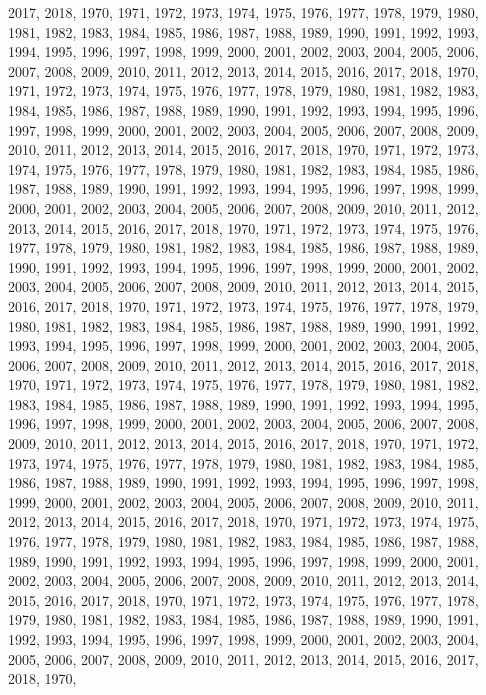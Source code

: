 \documentclass[
]{article}
\begin{document}
2017, 2018, 1970, 1971, 1972, 1973, 1974, 1975, 1976, 1977, 1978, 1979,
1980, 1981, 1982, 1983, 1984, 1985, 1986, 1987, 1988, 1989, 1990, 1991,
1992, 1993, 1994, 1995, 1996, 1997, 1998, 1999, 2000, 2001, 2002, 2003,
2004, 2005, 2006, 2007, 2008, 2009, 2010, 2011, 2012, 2013, 2014, 2015,
2016, 2017, 2018, 1970, 1971, 1972, 1973, 1974, 1975, 1976, 1977, 1978,
1979, 1980, 1981, 1982, 1983, 1984, 1985, 1986, 1987, 1988, 1989, 1990,
1991, 1992, 1993, 1994, 1995, 1996, 1997, 1998, 1999, 2000, 2001, 2002,
2003, 2004, 2005, 2006, 2007, 2008, 2009, 2010, 2011, 2012, 2013, 2014,
2015, 2016, 2017, 2018, 1970, 1971, 1972, 1973, 1974, 1975, 1976, 1977,
1978, 1979, 1980, 1981, 1982, 1983, 1984, 1985, 1986, 1987, 1988, 1989,
1990, 1991, 1992, 1993, 1994, 1995, 1996, 1997, 1998, 1999, 2000, 2001,
2002, 2003, 2004, 2005, 2006, 2007, 2008, 2009, 2010, 2011, 2012, 2013,
2014, 2015, 2016, 2017, 2018, 1970, 1971, 1972, 1973, 1974, 1975, 1976,
1977, 1978, 1979, 1980, 1981, 1982, 1983, 1984, 1985, 1986, 1987, 1988,
1989, 1990, 1991, 1992, 1993, 1994, 1995, 1996, 1997, 1998, 1999, 2000,
2001, 2002, 2003, 2004, 2005, 2006, 2007, 2008, 2009, 2010, 2011, 2012,
2013, 2014, 2015, 2016, 2017, 2018, 1970, 1971, 1972, 1973, 1974, 1975,
1976, 1977, 1978, 1979, 1980, 1981, 1982, 1983, 1984, 1985, 1986, 1987,
1988, 1989, 1990, 1991, 1992, 1993, 1994, 1995, 1996, 1997, 1998, 1999,
2000, 2001, 2002, 2003, 2004, 2005, 2006, 2007, 2008, 2009, 2010, 2011,
2012, 2013, 2014, 2015, 2016, 2017, 2018, 1970, 1971, 1972, 1973, 1974,
1975, 1976, 1977, 1978, 1979, 1980, 1981, 1982, 1983, 1984, 1985, 1986,
1987, 1988, 1989, 1990, 1991, 1992, 1993, 1994, 1995, 1996, 1997, 1998,
1999, 2000, 2001, 2002, 2003, 2004, 2005, 2006, 2007, 2008, 2009, 2010,
2011, 2012, 2013, 2014, 2015, 2016, 2017, 2018, 1970, 1971, 1972, 1973,
1974, 1975, 1976, 1977, 1978, 1979, 1980, 1981, 1982, 1983, 1984, 1985,
1986, 1987, 1988, 1989, 1990, 1991, 1992, 1993, 1994, 1995, 1996, 1997,
1998, 1999, 2000, 2001, 2002, 2003, 2004, 2005, 2006, 2007, 2008, 2009,
2010, 2011, 2012, 2013, 2014, 2015, 2016, 2017, 2018, 1970, 1971, 1972,
1973, 1974, 1975, 1976, 1977, 1978, 1979, 1980, 1981, 1982, 1983, 1984,
1985, 1986, 1987, 1988, 1989, 1990, 1991, 1992, 1993, 1994, 1995, 1996,
1997, 1998, 1999, 2000, 2001, 2002, 2003, 2004, 2005, 2006, 2007, 2008,
2009, 2010, 2011, 2012, 2013, 2014, 2015, 2016, 2017, 2018, 1970, 1971,
1972, 1973, 1974, 1975, 1976, 1977, 1978, 1979, 1980, 1981, 1982, 1983,
1984, 1985, 1986, 1987, 1988, 1989, 1990, 1991, 1992, 1993, 1994, 1995,
1996, 1997, 1998, 1999, 2000, 2001, 2002, 2003, 2004, 2005, 2006, 2007,
2008, 2009, 2010, 2011, 2012, 2013, 2014, 2015, 2016, 2017, 2018, 1970,
\end{document}
